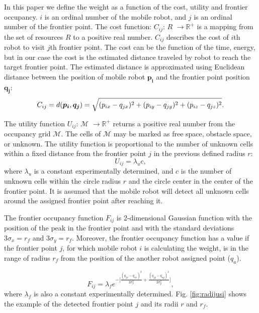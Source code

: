 \documentclass[letterpaper, 10 pt, conference]{ieeeconf}  %
\begin{document}
In this paper we define the weight as a function of the cost, utility and frontier occupancy.  $i$ is an ordinal number of the mobile robot, and $j$ is an ordinal number of the frontier point. The cost function: $C_{ij}$: $R$ \(\rightarrow \text{$\mathbb{R}^{+}$}\) is a mapping from the set of resources $R$ to a positive real number. $C_{ij}$ describes the cost of $i$th robot to visit $j$th frontier point. The cost can be the function of the time, energy, but in our case the cost is the estimated distance traveled by robot to reach the target frontier point. The estimated distance is approximated using Euclidean distance between the position of mobile robot $\boldsymbol{p_{i}}$ and the frontier point position $\boldsymbol{q_{j}}$:
\begin{equation}\small
    C_{ij}=d(\boldsymbol{p_{i}}, \boldsymbol{q_{j}}) = \sqrt{(p_{ix}-q_{jx})^{2}+(p_{iy}-q_{jy})^{2}+(p_{iz}-q_{jz})^{2}}.
    \label{cost}
\end{equation}

The utility function $U_{ij}$:  \(\text{$\mathcal {M}$}\) \(\rightarrow \text{$\mathbb{R}^{+}$}\) returns a positive real number from the occupancy grid \(\text{$\mathcal {M}$}\). The cells of \(\text{$\mathcal {M}$}\) may be marked as free space, obstacle space, or unknown. The utility function is proportional to the number of unknown cells within a fixed distance from the frontier point $j$ in the previous defined radius $r$: 
\begin{equation}
    U_{ij} = \lambda_{u}c,
\end{equation}
where $\lambda_{u}$ is a constant experimentally determined, and  $c$ is the number of unknown cells within the circle radius $r$ and the circle center in the center of the frontier point. It is assumed that the mobile robot will detect all unknown cells around the assigned frontier point after reaching it. 

The frontier occupancy function $F_{ij}$ is 2-dimensional Gaussian function with the position of the peak in the frontier point and with the standard deviations $3\sigma_{x}=r_{f}$ and $3\sigma_{y}=r_{f}$. Moreover, the frontier occupancy function has a value if the frontier point $j$, for which mobile robot $i$ is calculating the weight, is in the range of radius $r_{f}$ from the position of the another robot assigned point ($q_{a}$). 

\begin{equation}
    F_{ij} =  \lambda_{f} e^{-\Big[\frac{(q_{jx} - q_{ax})^2}{2\sigma_{x}^2} + \frac{(q_{jy} - q_{ay})^2}{2\sigma_{y}^2}\Big]},
\end{equation}
where $\lambda_{f}$  is also  a constant experimentally determined. Fig. \ref{fig:radijusi} shows the example of the detected frontier point $j$ and its radii $r$ and $r_{f}$.
\end{document}
